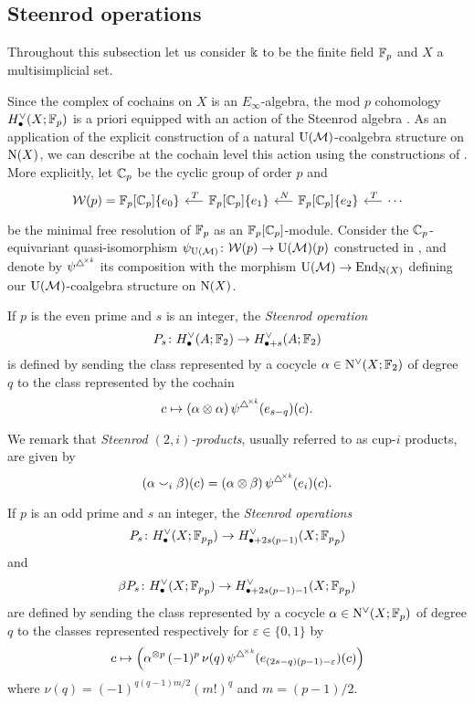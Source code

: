 \subsection{Steenrod operations}

Throughout this subsection let us consider $\Bbbk$ to be the finite field ${\mathbb{F}_p}$ and $X$ a multisimplicial set.

Since the complex of cochains on $X$ is an $E_\infty$-algebra, the mod $p$ cohomology $H_\bullet^{\vee}(X; {\mathbb{F}_p})$ is a priori equipped with an action of the Steenrod algebra \cite{steenrod1962cohomology, may1970general}.
As an application of the explicit construction of a natural ${\operatorname{U}(\mathcal{M})}$-coalgebra structure on $\operatorname{N}(X)$, we can describe at the cochain level this action using the constructions of \cite{medina2020maysteenrod}.
More explicitly, let ${\mathbb{C}_p}$ be the cyclic group of order $p$ and
\[
\begin{tikzcd} [column sep = .5cm]
\cW(p) = \Fp[\Cp]\{e_0\} & \arrow[l, "\,T"'] \Fp[\Cp]\{e_1\} & \arrow[l, "\,N"'] \Fp[\Cp]\{e_2\} & \arrow[l, "\,T"'] \dotsb
\end{tikzcd}
\]
be the minimal free resolution of ${\mathbb{F}_p}$ as an ${\mathbb{F}_p}[{\mathbb{C}_p}]$-module.
Consider the ${\mathbb{C}_p}$-equivariant quasi-isomorphism $\psi_{\operatorname{U}(\mathcal{M})} \colon \mathcal{W}(p) \to {\operatorname{U}(\mathcal{M})}(p)$ constructed in \cite{medina2020maysteenrod}, and denote by $\psi^{\triangle^{\!\times\mathit{k}}}$ its composition with the morphism ${\operatorname{U}(\mathcal{M})} \to \mathrm{End}_{\operatorname{N}(X)}$ defining our ${\operatorname{U}(\mathcal{M})}$-coalgebra structure on $\operatorname{N}(X)$.

If $p$ is the even prime and $s$ is an integer, the \textit{Steenrod operation}
\begin{equation*}
P_s \colon H^\vee_\bullet(A; \mathbb{F}_2) \to H^\vee_{\bullet + s}(A; \mathbb{F}_2)
\end{equation*}
is defined by sending the class represented by a cocycle $\alpha \in \operatorname{N^{\vee}}(X; \mathbb{F}_2)$ of degree $q$ to the class represented by the cochain
\[
c \mapsto (\alpha \otimes \alpha) \, \psi^{\triangle^{\!\times\mathit{k}}}(e_{s-q})(c).
\]

We remark that \textit{Steenrod $(2,i)$-products}, usually referred to as cup-$i$ products, are given by
\begin{equation} \label{e:cup-i products}
(\alpha \smallsmile_i \beta)(c) = (\alpha \otimes \beta) \, \psi^{\triangle^{\!\times\mathit{k}}}(e_{i})(c).
\end{equation}

If $p$ is an odd prime and $s$ an integer, the \textit{Steenrod operations}
\begin{equation*}
P_s \colon H^\vee_\bullet(X; {\mathbb{F}_p}_p) \to H^\vee_{\bullet + 2s(p-1)}(X; {\mathbb{F}_p}_p)
\end{equation*}
and
\begin{equation*}
\beta P_s \colon H^\vee_\bullet(X; {\mathbb{F}_p}_p) \to H^\vee_{\bullet + 2s(p-1) - 1}(X; {\mathbb{F}_p}_p)
\end{equation*}
are defined by sending the class represented by a cocycle $\alpha \in \operatorname{N^{\vee}}(X; {\mathbb{F}_p})$ of degree $q$ to the classes represented respectively for $\varepsilon \in \{0,1\}$ by
\[
c \mapsto
\Big( \alpha^{\otimes p} \, (-1)^p \, \nu(q) \, \psi^{\triangle^{\!\times\mathit{k}}}(e_{(2s-q)(p-1)-\varepsilon})(c) \Big)
\]
where $\nu(q) = (-1)^{q(q-1)m/2}(m!)^q$ and $m = (p-1)/2$.

